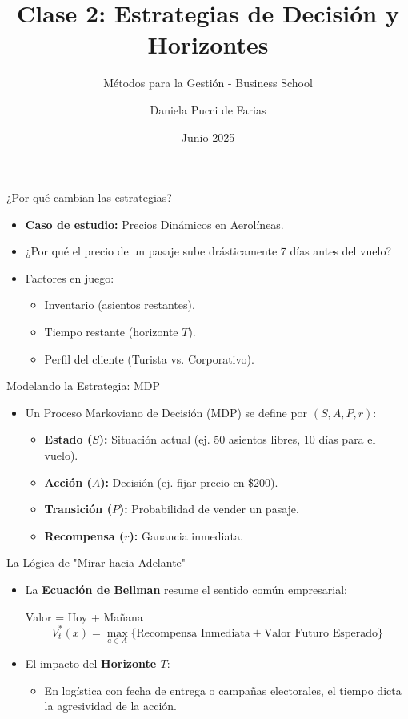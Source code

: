 \documentclass[handout]{beamer}
\title{Clase 2: Estrategias de Decisión y Horizontes}
\subtitle{Métodos para la Gestión - Business School}
\author{Daniela Pucci de Farias}
\institute{Universidad Torcuato Di Tella}
\date{Junio 2025}
\begin{document}
\frame{\titlepage}

\begin{frame}{¿Por qué cambian las estrategias?}
\begin{itemize}
    \item \textbf{Caso de estudio:} Precios Dinámicos en Aerolíneas.
    \item ¿Por qué el precio de un pasaje sube drásticamente 7 días antes del vuelo?
    \item Factores en juego:
    \begin{itemize}
        \item Inventario (asientos restantes).
        \item Tiempo restante (horizonte $T$).
        \item Perfil del cliente (Turista vs. Corporativo).
    \end{itemize}
\end{itemize}
\end{frame}

\begin{frame}{Modelando la Estrategia: MDP}
\begin{itemize}
    \item Un Proceso Markoviano de Decisión (MDP) se define por $(S, A, P, r)$:
    \begin{itemize}
        \item \textbf{Estado ($S$):} Situación actual (ej. 50 asientos libres, 10 días para el vuelo).
        \item \textbf{Acción ($A$):} Decisión (ej. fijar precio en \$200).
        \item \textbf{Transición ($P$):} Probabilidad de vender un pasaje.
        \item \textbf{Recompensa ($r$):} Ganancia inmediata.
    \end{itemize}
\end{itemize}
\end{frame}

\begin{frame}{La Lógica de "Mirar hacia Adelante"}
\begin{itemize}
    \item La \textbf{Ecuación de Bellman} resume el sentido común empresarial:
    \begin{block}{Valor = Hoy + Mañana}
    $$V_t^*(x) = \max_{a \in A} \{ \text{Recompensa Inmediata} + \text{Valor Futuro Esperado} \}$$
    \end{block}
    \item El impacto del \textbf{Horizonte $T$}:
    \begin{itemize}
        \item En logística con fecha de entrega o campañas electorales, el tiempo dicta la agresividad de la acción.
    \end{itemize}
\end{itemize}
\end{frame}
\end{document}
